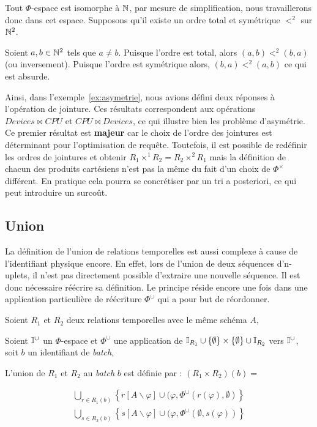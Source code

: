 \begin{demo}
    Tout $\Phi$-espace est isomorphe à $\mathbb{N}$, par mesure de simplification, nous travaillerons donc dans cet espace. Supposons qu'il existe un ordre total et symétrique $<^2$ sur $\mathbb{N}^2$.

    Soient $a,b\in \mathbb{N}^2$ tels que $a \neq b$. Puisque l'ordre est total, alors $(a,b) <^2 (b,a)$ (ou inversement). Puisque l'ordre est symétrique alors, $(b,a) <^2 (a,b)$ ce qui est absurde.
\end{demo}

Ainsi, dans l'exemple~\ref{ex:asymetrie}, nous avions défini deux réponses à l'opération de jointure. Ces résultats correspondent aux opérations $Devices\Join CPU$ et $CPU \Join Devices$, ce qui illustre bien les problème d'asymétrie. Ce premier résultat est \textbf{majeur} car le choix de l'ordre des jointures est déterminant pour l'optimisation de requête. Toutefois, il est possible de redéfinir les ordres de jointures et obtenir $R_1 \times^1 R_2 = R_2 \times^2 R_1$ mais la définition de chacun des produits cartésiens n'est pas la même du fait d'un choix de $\Phi^\times$ différent. En pratique cela pourra se concrétiser par un tri a posteriori, ce qui peut introduire un surcoût.

\subsection{Union}
La définition de l'union de relations temporelles est aussi complexe à cause de l'identifiant physique encore. En effet, lors de l'union de deux séquences d'n-uplets, il n'est pas directement possible d'extraire une nouvelle séquence. Il est donc nécessaire réécrire sa définition. Le principe réside encore une fois dans une application particulière de réécriture $\Phi^\cup$ qui a pour but de réordonner.
\begin{defi}
    Soient $R_1$ et $R_2$ deux relations temporelles avec le même schéma $A$,

    Soient $\mathbb{I}^{\cup}$ un $\Phi$-espace et $\Phi^\cup$ une application de $\mathbb{I}_{R_1}\cup\{\emptyset\}\times\{\emptyset\}\cup\mathbb{I}_{R_2}$ vers $\mathbb{I}^\cup$, soit $b$ un identifiant de \textit{batch},

    L'union de $R_1$ et $R_2$ au \textit{batch} $b$ est définie par : $(R_1\times R_2)(b)=$ 

        $$\begin{array}{c}
            \bigcup_{\scriptstyle r \in R_1(b)} \left\{ r[A\backslash \varphi] \cup (\varphi, \Phi^\cup(r(\varphi),\emptyset) \right\} \\
            \bigcup_{\scriptstyle s \in R_2(b)} \left\{ s[A\backslash \varphi] \cup (\varphi, \Phi^\cup(\emptyset,s(\varphi)) \right\}
        \end{array}$$
\end{defi}

